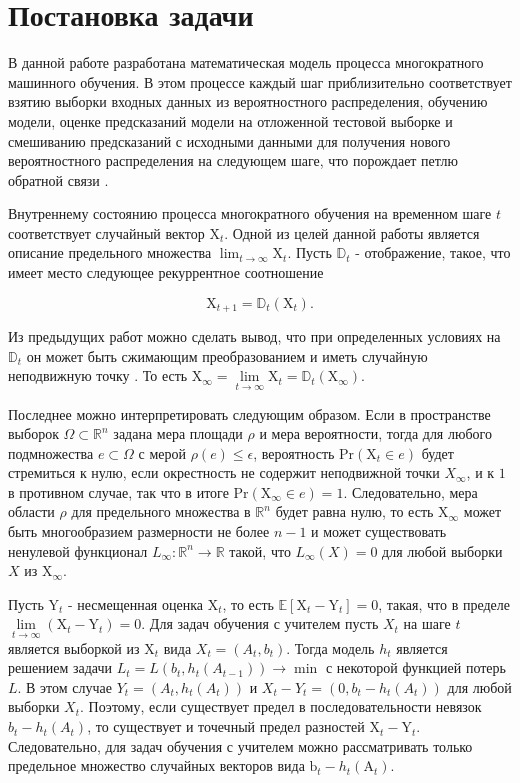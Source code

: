 \section{Постановка задачи} \label{sec:Problem_statement}

В данной работе разработана математическая модель процесса многократного машинного обучения. В этом процессе каждый шаг приблизительно соответствует взятию выборки входных данных из вероятностного распределения, обучению модели, оценке предсказаний модели на отложенной тестовой выборке и смешиванию предсказаний с исходными данными для получения нового вероятностного распределения на следующем шаге, что порождает петлю обратной связи \cite{khritankov2021existence}.

Внутреннему состоянию процесса многократного обучения на временном шаге $t$ соответствует случайный вектор $\text{X}_t$. Одной из целей данной работы является описание предельного множества $\lim_{t \to \infty} \text{X}_t$. Пусть $\mathbb{D}_t$ - отображение, такое, что имеет место следующее рекуррентное соотношение

\[
    \text{X}_{t+1} = \mathbb{D}_t (\text{X}_t).
\]

Из предыдущих работ \cite{khritankov2021hidden, khritankov2023positive} можно сделать вывод, что при определенных условиях на $\mathbb{D}_t$ он может быть сжимающим преобразованием и иметь случайную неподвижную точку \citep{itoh1977random}. То есть $\text{X}_{\infty} = \lim\limits_{t \to \infty} \text{X}_{t} = \mathbb{D}_t (\text{X}_{\infty})$. 

Последнее можно интерпретировать следующим образом. Если в пространстве выборок $\Omega \subset \mathbb{R}^n$ задана мера площади $\rho$ и мера вероятности, тогда для любого подмножества $e \subset \Omega$ с мерой $\rho(e)\leq \epsilon$, вероятность $\text{Pr}(\text{X}_t \in e)$ будет стремиться к нулю, если окрестность не содержит неподвижной точки $X_{\infty}$, и к $1$ в противном случае, так что в итоге $\text{Pr}(\text{X}_{\infty} \in e) = 1$. Следовательно, мера области $\rho$ для предельного множества в $\mathbb{R}^n$ будет равна нулю, то есть $\text{X}_{\infty}$ может быть многообразием размерности не более $n-1$ и может существовать ненулевой функционал $L_{\infty}: \mathbb{R}^n \to \mathbb{R}$ такой, что $L_{\infty}(X) = 0$ для любой выборки $X$ из $\text{X}_\infty$.

Пусть $\text{Y}_t$ - несмещенная оценка $\text{X}_t$, то есть $\mathbb{E}\left[\text{X}_t - \text{Y}_t\right] = 0$, такая, что в пределе $\lim\limits_{t \to \infty} \left(\text{X}_t - \text{Y}_t \right) = 0$.  Для задач обучения с учителем пусть $X_t$ на шаге $t$ является выборкой из $\text{X}_t$ вида $X_t = (A_t, b_t)$. Тогда модель $h_t$ является решением задачи $L_t = L(b_t, h_t(A_{t-1})) \to \min$ с некоторой функцией потерь $L$. В этом случае $Y_t = (A_t, h_t(A_t))$ и $X_t - Y_t = (0, b_t - h_t(A_{t}))$ для любой выборки $X_t$. Поэтому, если существует предел в последовательности невязок $b_t - h_t(A_t)$, то существует и точечный предел разностей $\text{X}_t - \text{Y}_t$. Следовательно, для задач обучения с учителем можно рассматривать только предельное множество случайных векторов вида $\text{b}_t - h_t(\text{A}_t)$.

